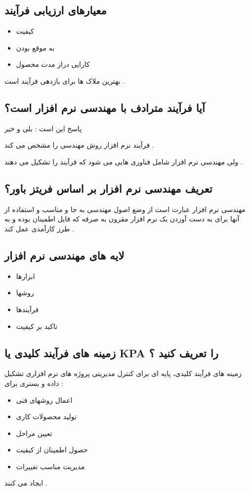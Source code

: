 \documentclass{article}
\begin{document}
\subsection{معیارهای ارزیابی فرآیند}

\begin{itemize}
	\item کیفیت
	\item به موقع بودن
	\item کارایی دراز مدت محصول
\end{itemize}
بهترین ملاک ها برای بازدهی فرآیند است .


\subsection{آیا فرآیند مترادف با مهندسی نرم افزار است؟}
پاسخ این است : بلی و خیر

فرآیند نرم افزار روش مهندسی را مشخص می کند .

ولی مهندسی نرم افزار شامل فناوری هایی می شود که فرآیند را تشکیل می دهند .



\subsection{تعریف مهندسی نرم افزار بر اساس فریتز باور؟}
مهندسی نرم افزار عبارت است از وضع اصول مهندسی به جا و مناسب و استفاده از آنها برای به دست آوردن یک نرم افزار مقرون به صرفه که قابل اطمینان بوده و به طرز کارآمدی عمل کند .



\subsection{لایه های مهندسی نرم افزار}

\begin{itemize}
	\item ابزارها
	\item روشها
	\item فرآیندها
	\item تاکید بر کیفیت
\end{itemize}


\subsection{زمینه های فرآیند کلیدی یا KPA را تعریف کنید ؟}
زمینه های فرآیند کلیدی، پایه ای برای کنترل مدیریتی پروژه های نرم افزاری تشکیل داده و بستری برای : 
\begin{itemize}
	\item اعمال روشهای فنی
	\item تولید محصولات کاری
	\item تعیین مراحل
	\item حصول اطمینان از کیفیت
	\item مدیریت مناسب تغییرات
\end{itemize}
ایجاد می کنند .
\end{document}
